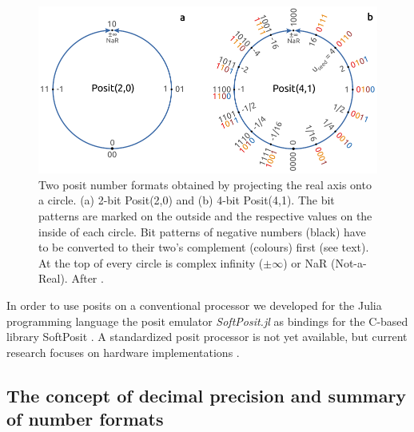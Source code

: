 \documentclass[draft]{agujournal2019}
\begin{document}
\begin{figure}[htbp]
\center
\includegraphics[width=1\textwidth]{circles.pdf}
\caption{Two posit number formats obtained by projecting the real axis onto a circle.
(a) 2-bit Posit(2,0) and (b) 4-bit Posit(4,1). The bit patterns are marked on the
outside and the respective values on the inside of each circle. Bit patterns of
negative numbers (black) have to be converted to their two's complement (colours)
first (see text). At the top of every circle is complex infinity ($\pm \infty$)
or NaR (Not-a-Real). After .}
\label{fig:circle}
\end{figure}

In order to use posits on a conventional processor we developed for the Julia
programming language \cite{Bezanson2017} the posit emulator \emph{SoftPosit.jl}
\cite{Klower2019b} as bindings for the C-based library SoftPosit \cite{Leong2020}.
A standardized posit processor is not yet available, but current research focuses
on hardware implementations \cite{Zhang2020,vanDam2019,Chen2018,Chaurasiya2018,Glaser2017}.

\subsection{The concept of decimal precision and summary of number formats}
\label{sec:decprec}
\end{document}

